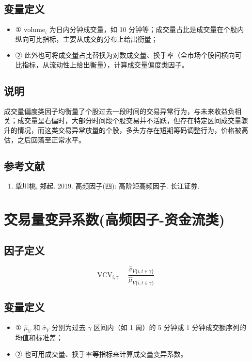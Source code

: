 \documentclass{article}
\begin{document}
\subsection{变量定义}
\begin{itemize}
    \item ① \( \mathrm{volume}_i \) 为日内分钟成交量，如 10 分钟等；成交量占比是成交量在个股内纵向可比指标，主要从成交的分布上给出衡量；
    \item ② 此外也可将成交量占比替换为对数成交量、换手率（全市场个股间横向可比指标，从流动性上给出衡量），计算成交量偏度类因子。
\end{itemize}

\subsection{说明}
成交量偏度类因子均衡量了个股过去一段时间的交易异常行为，与未来收益负相关；成交量呈右偏时，大部分时间段个股交易并不活跃，但存在特定区间成交量骤升的情况，而这类交易异常放量的个股，多头方存在短期筹码调整行为，价格被高估，之后回落至正常水平。

\subsection{参考文献}
\begin{enumerate}
    \item 覃川桃, 郑起. 2019. 高频因子(四): 高阶矩高频因子. 长江证券.
\end{enumerate}

\section{交易量变异系数(高频因子-资金流类)}

\subsection{因子定义}
\begin{equation}
    \mathrm{VCV}_{i,\gamma} = \frac{\hat{\sigma}_{V\{i,t \in \gamma\}}}{\hat{\mu}_{V\{i,t \in \gamma\}}}
\end{equation}

\subsection{变量定义}
\begin{itemize}
    \item ① \( \hat{\mu}_V \) 和 \( \hat{\sigma}_V \) 分别为过去 \( \gamma \) 区间内（如 1 周）的 5 分钟或 1 分钟成交额序列的均值和标准差；
    \item ② 也可用成交量、换手率等指标来计算成交量变异系数。
\end{itemize}
\end{document}
